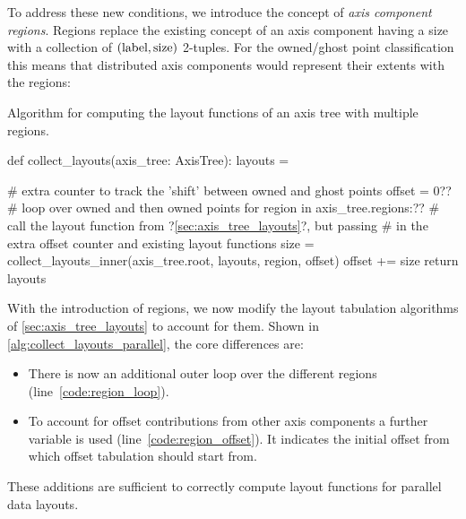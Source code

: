 \documentclass[thesis]{subfiles}
\begin{document}
To address these new conditions, we introduce the concept of \emph{axis component regions}.
Regions replace the existing concept of an axis component having a size with a collection of $(\textnormal{label}, \textnormal{size})$ 2-tuples.
For the owned/ghost point classification this means that distributed axis components would represent their extents with the regions:
\begin{pyinline}
\end{pyinline}

\begin{algorithm}
  \caption{
    Algorithm for computing the layout functions of an axis tree with multiple regions.
  }
  \begin{center}
    \begin{minipage}{.9\textwidth}
      \begin{pyalg2}
        def collect_layouts(axis_tree: AxisTree):
          layouts = {}

          # extra counter to track the 'shift' between owned and ghost points
          offset = 0?\label{code:region_offset}?
          # loop over owned and then owned points
          for region in axis_tree.regions:?\label{code:region_loop}?
            # call the layout function from ?\cref{sec:axis_tree_layouts}?, but passing
            # in the extra offset counter and existing layout functions
            size = collect_layouts_inner(axis_tree.root, layouts, region, offset)
            offset += size
          return layouts
      \end{pyalg2}
    \end{minipage}
  \end{center}
  \label{alg:collect_layouts_parallel}
\end{algorithm}

With the introduction of regions, we now modify the layout tabulation algorithms of \cref{sec:axis_tree_layouts} to account for them.
Shown in \cref{alg:collect_layouts_parallel}, the core differences are:
\begin{itemize}
  \item
    There is now an additional outer loop over the different regions (line~\ref{code:region_loop}).
  \item
    To account for offset contributions from other axis components a further  variable is used (line~\ref{code:region_offset}).
    It indicates the initial offset from which offset tabulation should start from.
\end{itemize}
These additions are sufficient to correctly compute layout functions for parallel data layouts.
\end{document}
